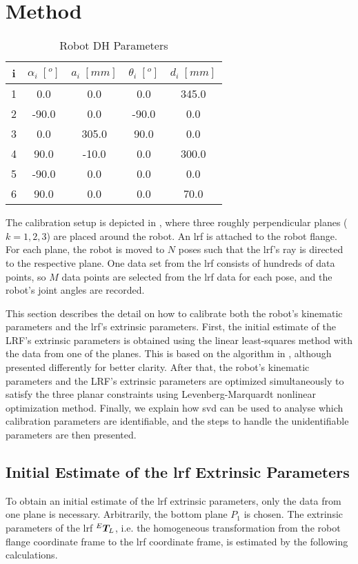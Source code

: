 \section{Method}
\label{sec:method}

\renewcommand{\arraystretch}{1.5}
\begin{table}[htp]
\caption{Robot DH Parameters}
\label{tab:dh_params}
\centering
\begin{tabular}{c c c c c}
\toprule
i &  \textbf{$\alpha_i \;[^o]$} & \textbf{$a_i \;[mm]$} &  \textbf{$\theta_i \;[^o]$}  & \textbf{$d_i \;[mm]$}\\
\midrule
1 & 0.0 & 0.0 & 0.0 & 345.0\\
2 & -90.0 & 0.0 & -90.0 & 0.0\\
3 & 0.0 & 305.0 & 90.0 & 0.0\\
4 & 90.0 & -10.0 & 0.0 & 300.0\\
5 & -90.0 & 0.0 & 0.0 & 0.0\\
6 & 90.0 & 0.0 & 0.0 & 70.0\\
\bottomrule
\end{tabular}
\end{table}

The calibration setup is depicted in , where three roughly perpendicular planes ($k=1,2,3$) are placed around the robot. An \ac{lrf} is attached to the robot flange. For each plane, the robot is moved to $N$ poses such that the \ac{lrf}'s ray is directed to the respective plane. One data set from the \ac{lrf} consists of hundreds of data points, so $M$ data points are selected from the \ac{lrf} data for each pose, and the robot's joint angles are recorded. 

This section describes the detail on how to calibrate both the robot's kinematic parameters and the \ac{lrf}'s extrinsic parameters. First, the initial estimate of the LRF's extrinsic parameters is obtained using the linear least-squares method with the data from one of the planes. This is based on the algorithm in \cite{Zhang2004}, although presented differently for better clarity. After that, the robot's kinematic parameters and the LRF's extrinsic parameters are optimized simultaneously to satisfy the three planar constraints using Levenberg-Marquardt nonlinear optimization method. Finally, we explain how \ac{svd} can be used to analyse which calibration parameters are identifiable, and the steps to handle the unidentifiable parameters are then presented. 
\subsection{Initial Estimate of the \ac{lrf} Extrinsic Parameters}
\label{sec:first_step}
To obtain an initial estimate of the \ac{lrf} extrinsic parameters, only the data from one plane is necessary. Arbitrarily, the bottom plane $P_1$ is chosen. The extrinsic parameters of the \ac{lrf} ${^E}\vb*{T}_L$, i.e. the homogeneous transformation from the robot flange coordinate frame to the \ac{lrf} coordinate frame, is estimated by the following calculations.

